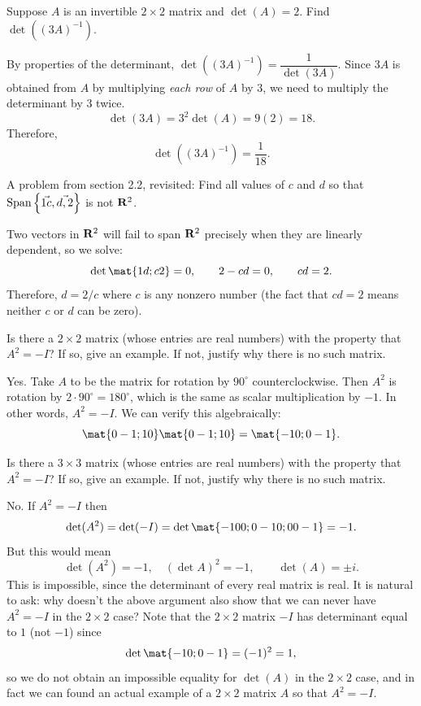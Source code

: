 \begin{problems}
\problem  %
%
Suppose $A$ is an invertible $2 \times 2$ matrix and $\det(A) = 2$.
Find $\det( (3A)^{-1} )$.

\begin{solution}
  By properties of the determinant,
  $\det( (3A)^{-1} ) = \dfrac{1}{\det(3A)}$.  Since $3A$ is obtained
  from $A$ by multiplying \textit{each row} of $A$ by $3$, we need to
  multiply the determinant by $3$ twice.
  \[\det(3A) = 3^2 \det(A) = 9 (2) = 18.\]
  Therefore,
  \[\det((3A)^{-1}) = \dfrac{1}{18}.\]
\end{solution}
          

\problem %
A problem from section 2.2, revisited: \newline Find all
values of $c$ and $d$ so that
$\textup{Span}\left\{\vec{1 c}, \vec{d, 2}\right\}$ is not
${\bf R}^2$.

\begin{solution}
  Two vectors in ${\bf R}^2$ will fail to span ${\bf R}^2$ precisely when
  they are linearly dependent, so we solve:
  \[\det\mat{1 d; c 2} = 0, \qquad 2 - cd = 0, \qquad cd = 2.\]
  Therefore, $d = 2/c$ where $c$ is any nonzero number (the fact that
  $cd=2$ means neither $c$ or $d$ can be zero).
\end{solution}


\problem %
Is there a $2 \times 2$ matrix (whose entries are real numbers) with the property
that $A^2 = -I$?  If so, give an example.  If not, justify why there is no such
matrix.  

\begin{solution}
  Yes.  Take $A$ to be the matrix for rotation by $90^\circ$ counterclockwise.
  Then $A^2$ is rotation by $2 \cdot 90 ^\circ = 180^\circ$, which is the same
  as scalar multiplication by $-1$.  In other words, $A^2 = -I$.  We can verify
  this algebraically:
  \[\mat{0 -1; 1 0} \mat{0 -1; 1 0} = \mat{-1 0; 0 -1}.\]
\end{solution}

\problem %
Is there a $3 \times 3$ matrix (whose entries are real numbers) with the
property that $A^2 = -I$?  If so, give an example.  If not, justify why there is
no such matrix.  

\begin{solution}
  No.  If $A^2 = -I$ then \[\det(A^2) = \det(-I) = \det\mat{-1 0 0; 0 -1 0; 0 0 -1} = -1.\]
  But this would mean
  \[\det(A^2) = -1, \quad (\det A)^2 = -1, \qquad \det(A) = \pm i.\]
  This is impossible, since the determinant of every real matrix is real.
  \newline \newline It is natural to ask: why doesn't the above argument also
  show that we can never have $A^2 = -I$ in the $2 \times 2$ case?  Note that
  the $2 \times 2$ matrix $-I$ has determinant equal to $1$ (not $-1$) since
  \[\det\mat{-1 0; 0 -1} = (-1)^2 = 1,\] so we do not obtain an impossible
  equality for $\det(A)$ in the $2 \times 2$ case, and in fact we can found an
  actual example of a $2 \times 2$ matrix $A$ so that $A^2 = -I$.
\end{solution}




\end{problems}
